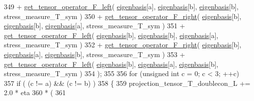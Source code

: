 \begin{DoxyCode}
349                                                       + 
      \hyperlink{functions_8h_a6f9435c7728281851248d3537c100e7d}{get\_tensor\_operator\_F\_left}(  \hyperlink{classln__space_a1e67221edabbd2db69aa4a21262bd1f4}{eigenbasis}[a], 
      \hyperlink{classln__space_a1e67221edabbd2db69aa4a21262bd1f4}{eigenbasis}[b], \hyperlink{classln__space_a1e67221edabbd2db69aa4a21262bd1f4}{eigenbasis}[b], stress\_measure\_T\_sym )
350                                                       + 
      \hyperlink{functions_8h_acfd8da38df3766246f7bcf0e736ad9f4}{get\_tensor\_operator\_F\_right}( \hyperlink{classln__space_a1e67221edabbd2db69aa4a21262bd1f4}{eigenbasis}[b], 
      \hyperlink{classln__space_a1e67221edabbd2db69aa4a21262bd1f4}{eigenbasis}[b], \hyperlink{classln__space_a1e67221edabbd2db69aa4a21262bd1f4}{eigenbasis}[a], stress\_measure\_T\_sym )
351                                                       + 
      \hyperlink{functions_8h_a6f9435c7728281851248d3537c100e7d}{get\_tensor\_operator\_F\_left}(  \hyperlink{classln__space_a1e67221edabbd2db69aa4a21262bd1f4}{eigenbasis}[b], 
      \hyperlink{classln__space_a1e67221edabbd2db69aa4a21262bd1f4}{eigenbasis}[b], \hyperlink{classln__space_a1e67221edabbd2db69aa4a21262bd1f4}{eigenbasis}[a], stress\_measure\_T\_sym )
352                                                       + 
      \hyperlink{functions_8h_acfd8da38df3766246f7bcf0e736ad9f4}{get\_tensor\_operator\_F\_right}( \hyperlink{classln__space_a1e67221edabbd2db69aa4a21262bd1f4}{eigenbasis}[b], 
      \hyperlink{classln__space_a1e67221edabbd2db69aa4a21262bd1f4}{eigenbasis}[a], \hyperlink{classln__space_a1e67221edabbd2db69aa4a21262bd1f4}{eigenbasis}[b], stress\_measure\_T\_sym )
353                                                       + 
      \hyperlink{functions_8h_a6f9435c7728281851248d3537c100e7d}{get\_tensor\_operator\_F\_left}(  \hyperlink{classln__space_a1e67221edabbd2db69aa4a21262bd1f4}{eigenbasis}[b], 
      \hyperlink{classln__space_a1e67221edabbd2db69aa4a21262bd1f4}{eigenbasis}[a], \hyperlink{classln__space_a1e67221edabbd2db69aa4a21262bd1f4}{eigenbasis}[b], stress\_measure\_T\_sym )
354                                                      );
355 
356                 \textcolor{keywordflow}{for} (\textcolor{keywordtype}{unsigned} \textcolor{keywordtype}{int} c = 0; c < 3; ++c)
357                     \textcolor{keywordflow}{if} ( (c != a) && (c != b) )
358                     \{
359                         projection\_tensor\_T\_doublecon\_L += 2.0 * eta
360                                                            * (
361                                                                   

\end{DoxyCode}
